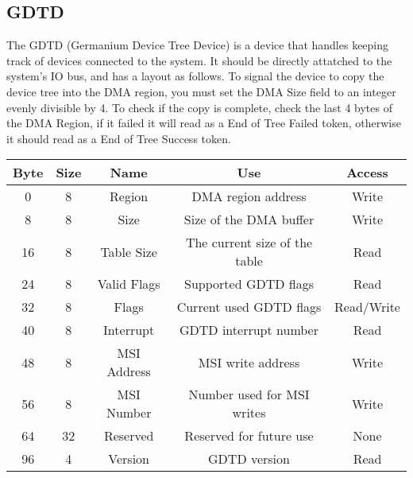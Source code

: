 \documentclass{article}
\begin{document}
\subsection{GDTD}
The GDTD (Germanium Device Tree Device) is a device that handles keeping track of devices connected to the system. It should be directly attatched to the system's IO bus, and has a layout as follows. To signal the device to copy the device tree into the DMA region, you must set the DMA Size field to an integer evenly divisible by 4. To check if the copy is complete, check the last 4 bytes of the DMA Region, if it failed it will read as a End of Tree Failed token, otherwise it should read as a End of Tree Success token.
\\
\begin{center}
\begin{tabular}{ |c|c|c|c|c| }
    \hline
    Byte & Size & Name & Use & Access \\
    \hline
    0 & 8 & Region & DMA region address & Write \\
    \hline
    8 & 8 & Size & Size of the DMA buffer & Write \\
    \hline
    16 & 8 & Table Size & The current size of the table\footnotemark[1] & Read \\
    \hline
    24 & 8 & Valid Flags & Supported GDTD flags & Read \\
    \hline
    32 & 8 & Flags & Current used GDTD flags\footnotemark[2] & Read/Write \\
    \hline
    40 & 8 & Interrupt & GDTD interrupt number & Read \\
    \hline
    48 & 8 & MSI Address & MSI write address & Write \\
    \hline
    56 & 8 & MSI Number & Number used for MSI writes & Write \\
    \hline
    64 & 32 & Reserved & Reserved for future use & None \\
    \hline
    96 & 4 & Version & GDTD version & Read \\
    \hline
\end{tabular}
\end{center}
\end{document}

